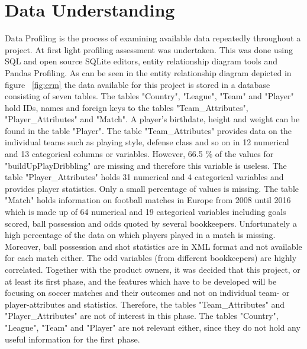 
\chapter{Data Understanding}
\label{chap:data_understanding}

Data Profiling is the process of examining available data repeatedly throughout a project. At first light profiling assessment was undertaken. This was done using SQL and open source SQLite editors, entity relationship diagram tools and Pandas Profiling. As can be seen in the entity relationship diagram depicted in figure ~\ref{fig:erm} the data available for this project is stored in a database consisting of seven tables.
\newline
The tables "Country", "League", "Team" and "Player" hold IDs, names and foreign keys to the tables "Team\_Attributes", "Player\_Attributes" and "Match". A player's birthdate, height and weight can be found in the table "Player".
\newline
The table "Team\_Attributes" provides data on the individual teams such as playing style, defense class and so on in 12 numerical and 13 categorical columns or variables. However, 66.5 \% of the values for "buildUpPlayDribbling" are missing and therefore this variable is useless.
\newline
The table "Player\_Attributes" holds 31 numerical and 4 categorical variables and provides player statistics. Only a small percentage of values is missing.
\newline
The table "Match" holds information on football matches in Europe from 2008 until 2016 which is made up of 64 numerical and 19 categorical variables including goals scored, ball possession and odds quoted by several bookkeepers. Unfortunately a high percentage of the data on which players played in a match is missing. Moreover, ball possession and shot statistics are in XML format and not available for each match either. The odd variables (from different bookkeepers) are highly correlated.   
\newline
Together with the product owners, it was decided that this project, or at least its first phase, and the features which have to be developed will be focusing on soccer matches and their outcomes and not on individual team- or player-attributes and statistics. Therefore, the tables "Team\_Attributes" and "Player\_Attributes" are not of interest in this phase. The tables "Country", "League", "Team" and "Player" are not relevant either, since they do not hold any useful information for the first phase.


